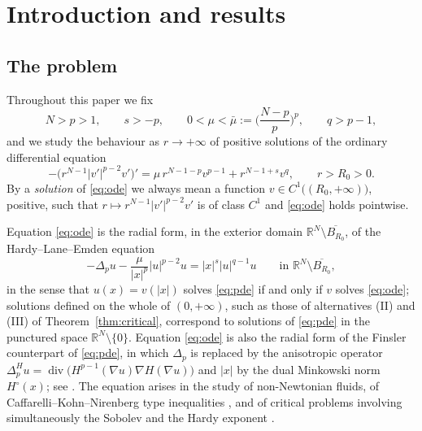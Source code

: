 \documentclass[11pt,reqno]{amsart}
\numberwithin{equation}{section}
\theoremstyle{plain}
\theoremstyle{definition}
\newcommand{\R}{\mathbb{R}}
\newcommand{\Ho}{H^{\circ}}
\newcommand{\mub}{\bar\mu}
\DeclareMathOperator{\dv}{div}
\begin{document}
\maketitle

\section{Introduction and results}

\subsection{The problem}

Throughout this paper we fix
\begin{equation}\label{eq:standing}
N>p>1,\qquad s>-p,\qquad 0<\mu<\mub:=\Big(\frac{N-p}{p}\Big)^{p},
\qquad q>p-1,
\end{equation}
and we study the behaviour as
$r\to+\infty$ of positive solutions of the ordinary differential equation
\begin{equation}\label{eq:ode}
-\big(r^{N-1}|v'|^{p-2}v'\big)'
=\mu\,r^{N-1-p}v^{p-1}+r^{N-1+s}v^{q},
\qquad r>R_{0}>0 .
\end{equation}
By a \emph{solution} of \eqref{eq:ode} we always mean a function
$v\in C^{1}\big((R_{0},+\infty)\big)$, positive, such that
$r\mapsto r^{N-1}|v'|^{p-2}v'$ is of class $C^{1}$ and \eqref{eq:ode} holds
pointwise.

Equation \eqref{eq:ode} is the radial form, in the exterior domain
$\R^{N}\setminus \overline{B_{R_{0}}}$, of the Hardy--Lane--Emden equation
\begin{equation}\label{eq:pde}
-\Delta_{p}u-\frac{\mu}{|x|^{p}}|u|^{p-2}u=|x|^{s}|u|^{q-1}u
\qquad\text{in }\R^{N}\setminus \overline{B_{R_{0}}} ,
\end{equation}
in the sense that $u(x)=v(|x|)$ solves \eqref{eq:pde} if and only if $v$ solves
\eqref{eq:ode}; solutions defined on the whole of $(0,+\infty)$, such as those
of alternatives {\rm(II)} and {\rm(III)} of Theorem~\ref{thm:critical},
correspond to solutions
of \eqref{eq:pde} in the punctured space $\R^{N}\setminus\{0\}$. Equation
\eqref{eq:ode} is also the radial form of the Finsler counterpart of
\eqref{eq:pde}, in which $\Delta_{p}$ is
replaced by the anisotropic operator
$\Delta^{H}_{p}u=\dv\big(H^{p-1}(\nabla u)\nabla H(\nabla u)\big)$ and $|x|$ by
the dual Minkowski norm $\Ho(x)$; see \cite{EMSV2024}. The equation arises in
the study of non-Newtonian fluids, of Caffarelli--Kohn--Nirenberg type
inequalities \cite{CKN}, and of critical problems involving simultaneously the
Sobolev and the Hardy exponent \cite{AbdellaouiPeral,GarciaAzoreroPeral}.
\end{document}
